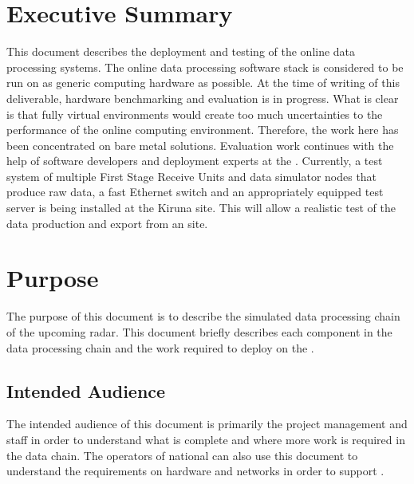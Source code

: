 \documentclass[12pt,a4paper]{article}
\begin{document}
\newpage
\tableofcontents
\newpage

\section{Executive Summary}
\label{exec-summ}


This document describes the deployment and testing of the \ED online data processing systems.
The \ED online data processing software stack is considered to be run on as generic computing hardware as possible. At the time of writing of this deliverable, hardware benchmarking and evaluation is in progress. 
What is clear is that fully virtual environments would create too much uncertainties to the performance of the online computing environment.  Therefore, the work here has been concentrated on bare metal solutions.
Evaluation work continues with the help of \ED software developers and deployment experts at the \nps.
Currently, a test system of multiple First Stage Receive Units and data simulator nodes that produce raw data, a fast Ethernet switch and an appropriately equipped test server is being installed at the Kiruna site.  This will allow a realistic test of the data production and export from an \ED site.

\section{Purpose}
\label{purpose}

The purpose of this document is to describe the simulated data processing chain of the upcoming \ED radar.
This document briefly describes each component in the data processing chain and the work required to deploy on the .

\subsection{Intended Audience}

The intended audience of this document is primarily the \ED project management and staff in order to understand what is complete and where more work is required in the data chain.
The operators of national  can also use this document to understand the requirements on hardware and networks in order to support \ED.
\end{document}
